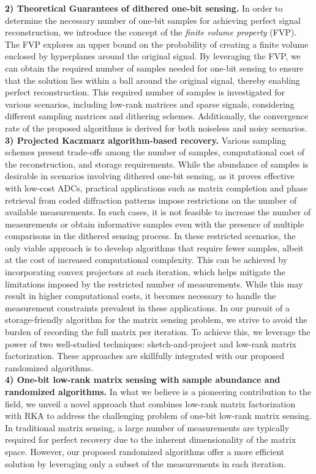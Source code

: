 \documentclass[12pt,draftcls,onecolumn]{IEEEtran}
\begin{document}
\textbf{2) Theoretical Guarantees of dithered one-bit sensing.} 
In order to determine the necessary number of one-bit samples for achieving perfect signal reconstruction, we introduce the concept of the \emph{finite volume property} (FVP). The FVP explores an upper bound on the probability of creating a finite volume enclosed by hyperplanes around the original signal. By leveraging the FVP, we can obtain the required number of samples needed for one-bit sensing to ensure that the solution lies within a ball around the original signal, thereby enabling perfect reconstruction.
This required number of samples is investigated for various scenarios, including low-rank matrices and sparse signals, considering different sampling matrices and dithering schemes. Additionally, the convergence rate of the proposed algorithms is derived for both noiseless and noisy scenarios.\\
\textbf{3) Projected Kaczmarz algorithm-based recovery.}
Various sampling schemes present trade-offs among the number of samples, computational cost of the reconstruction, and storage requirements. While the abundance of samples is desirable in scenarios involving dithered one-bit sensing, as it proves effective with low-cost ADCs, practical applications such as matrix completion and phase retrieval from coded diffraction patterns \cite{candes2015phase} impose restrictions on the number of available measurements. In such cases, it is not feasible to increase the number of measurements or obtain informative samples even with the presence of multiple comparisons in the dithered sensing process.
In these restricted scenarios, the only viable approach is to develop algorithms that require fewer samples, albeit at the cost of increased computational complexity. This can be achieved by incorporating convex projectors at each iteration, which helps mitigate the limitations imposed by the restricted number of measurements. While this may result in higher computational costs, it becomes necessary to handle the measurement constraints prevalent in these applications. In our pursuit of a storage-friendly algorithm for the matrix sensing problem, we strive to avoid the burden of recording the full matrix per iteration. To achieve this, we leverage the power of two well-studied techniques: sketch-and-project and low-rank matrix factorization. These approaches are skillfully integrated with our proposed randomized algorithms.
\\
\textbf{4) One-bit low-rank matrix sensing with sample abundance and randomized algorithms.} 
In what we believe is a pioneering contribution to the field, we unveil a novel approach that combines low-rank matrix factorization with RKA to address the challenging problem of one-bit low-rank matrix sensing. In traditional matrix sensing, a large number of measurements are typically required for perfect recovery due to the inherent dimensionality of the matrix space. However, our proposed randomized algorithms offer a more efficient solution by leveraging only a subset of the measurements in each iteration.
\end{document}

